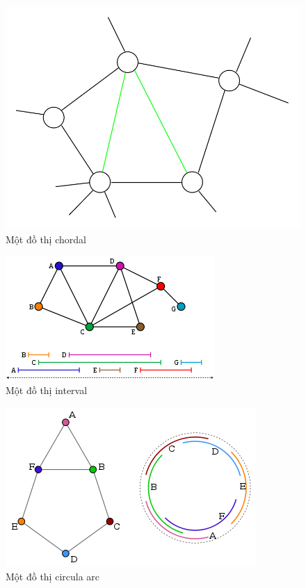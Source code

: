 \documentclass[14pt,a4paper]{extreport}
\begin{document}
\begin{figure}
	\centering
	\includegraphics[scale=.39]{chordal}
	\caption{Một đồ thị chordal}
\end{figure}

\begin{figure}
	\centering
	\includegraphics[scale=1]{interval}
	\caption{Một đồ thị interval}
\end{figure}

\begin{figure}
	\centering
	\includegraphics[scale=.9]{circular}
	\caption{Một đồ thị circula arc}
\end{figure}
\end{document}

